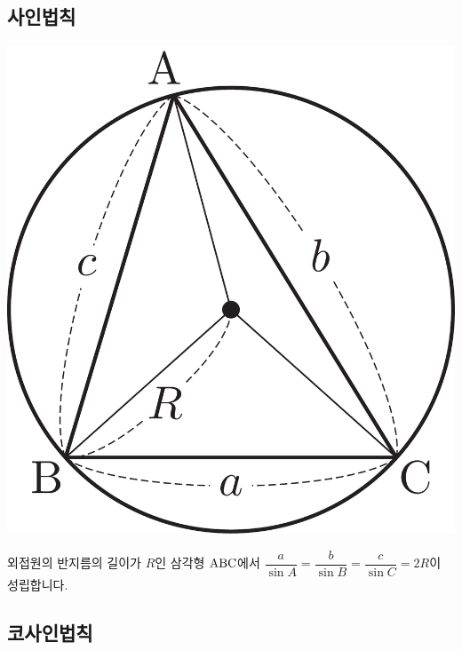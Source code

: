 \subsection{사인법칙}\begin{center}  \centering \includegraphics[scale=0.125]{pic0/pic164.pdf}\\
  \end{center}외접원의 반지름의 길이가 $R$인 삼각형 $\mathrm{ABC}$에서 $\dfrac{a}{\sin A}=\dfrac{b}{\sin B}=\dfrac{c}{\sin C}=2R$이 성립합니다.
\subsection{코사인법칙}

